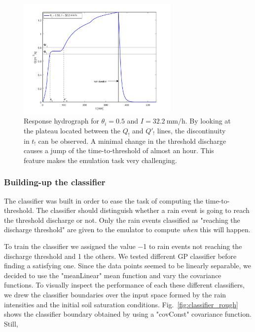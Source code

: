 \begin{figure}[h]
  \centering
  \includegraphics[width=0.7\textwidth]{Figures/hydrograph.png}
  \caption{Response hydrograph for $\theta_i = \num{0.5}$ and $I = \SI{32.2}{\milli\meter\per\hour}$. By looking at the plateau located between the $Q_!$ and $Q'_!$ lines, the discontinuity in $t_!$ can be observed. A minimal change in the threshold discharge causes a jump of the time-to-threshold of almost an hour. This feature makes the emulation task very challenging.}
  \label{fig:hydrograph}
\end{figure}

\subsubsection{Building-up the classifier}

The classifier was built in order to ease the task of computing the time-to-threshold.
The classifier should distinguish whether a rain event is going to reach the threshold discharge or not.
Only the rain events classified as "reaching the discharge threshold" are given to the emulator to compute \emph{when} this will happen.

To train the classifier we assigned the value \num{-1} to rain events not reaching the discharge threshold and \num{1} the others.  
We tested different GP classifier before finding a satisfying one.
Since the data points seemed to be linearly separable, we decided to use the "meanLinear" mean function and vary
the covariance functions.
To visually inspect the performance of each these different classifiers, we drew the classifier boundaries over the input space formed by the rain intensities and the initial soil saturation conditions. Fig.~\ref{fig:classifier_rough} shows the classifier boundary obtained by using a "covConst" covariance function.
Still, 
 
